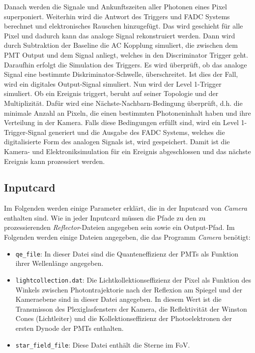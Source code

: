 Danach werden die Signale und Ankunftszeiten aller Photonen eines Pixel superponiert.
Weiterhin wird die Antwort des Triggers und FADC Systems berechnet und elektronisches Rauschen hinzugefügt.
Das wird geschieht für alle Pixel und dadurch kann das analoge Signal rekonstruiert werden.
Dann wird durch Subtraktion der Baseline die AC Kopplung simuliert, die zwischen dem PMT Output und dem Signal anliegt, welches in den Discriminator Trigger geht.
Daraufhin erfolgt die Simulation des Triggers. 
Es wird überprüft, ob das analoge Signal eine bestimmte Diskriminator-Schwelle, überschreitet.
Ist dies der Fall, wird ein digitales Output-Signal simuliert.
Nun wird der Level 1-Trigger simuliert.
Ob ein Ereignis triggert, beruht auf seiner Topologie und der Multiplizität.
Dafür wird eine Nächste-Nachbarn-Bedingung überprüft, d.h. die minimale Anzahl an Pixeln, die einen bestimmten Photoneninhalt haben und ihre Verteilung in der Kamera.
Falls diese Bedingungen erfüllt sind, wird ein Level 1-Trigger-Signal generiert und die Ausgabe des FADC Systems, welches die digitalisierte Form des analogen Signals ist, wird gespeichert.
Damit ist die Kamera- und Elektroniksimulation für ein Ereignis abgeschlossen und das nächste Ereignis kann prozessiert werden.

\subsection{Inputcard}
Im Folgenden werden einige Parameter erklärt, die in der Inputcard von \textit{Camera} enthalten sind.
Wie in jeder Inputcard müssen die Pfade zu den zu prozessierenden \textit{Reflector}-Dateien angegeben sein sowie ein Output-Pfad.
Im Folgenden werden einige Dateien angegeben, die das Programm \textit{Camera} benötigt:

\begin{itemize}
 \item \texttt{qe\_file}: In dieser Datei sind die Quanteneffizienz der PMTs als Funktion ihrer Wellenlänge angegeben.
 \item \texttt{lightcollection.dat}: Die Lichtkollektionseffizienz der Pixel als Funktion des Winkels zwischen Photontrajektorie nach der Reflexion am Spiegel und der Kameraebene sind in dieser Datei angegeben.
 In diesem Wert ist die Transmisson des Plexiglasfensters der Kamera, die Reflektivität der Winston Cones (Lichtleiter) und die Kollektionseffizienz der Photoelektronen der ersten Dynode der PMTs enthalten.
 \item \texttt{star\_field\_file}: Diese Datei enthält die Sterne im FoV.
\end{itemize}

